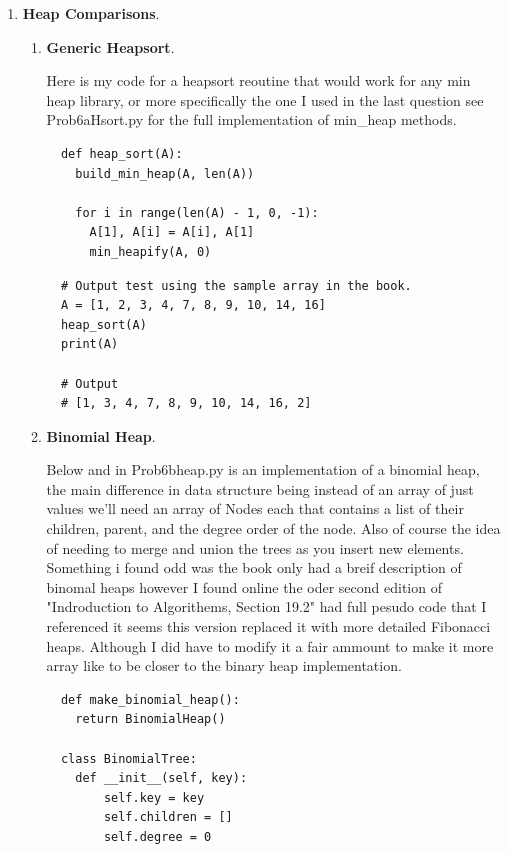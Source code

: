 \documentclass{article}
\begin{document}
\begin{enumerate}
\begin{enumerate}
  \end{enumerate}

  \item \textbf{Heap Comparisons}.
  
  \begin{enumerate}
    \item \textbf{Generic Heapsort}.
    
    Here is my code for a heapsort reoutine that would work for any min heap library, or more specifically the one I used in the last question see Prob6aHsort.py for the full implementation of min\_heap methods.
    
    \begin{lstlisting}
  def heap_sort(A):
    build_min_heap(A, len(A))

    for i in range(len(A) - 1, 0, -1):
      A[1], A[i] = A[i], A[1]
      min_heapify(A, 0)      
    \end{lstlisting}

    \begin{lstlisting}
  # Output test using the sample array in the book.
  A = [1, 2, 3, 4, 7, 8, 9, 10, 14, 16]
  heap_sort(A)
  print(A)

  # Output
  # [1, 3, 4, 7, 8, 9, 10, 14, 16, 2]
    \end{lstlisting}

    \item \textbf{Binomial Heap}.
    
    Below and in Prob6bheap.py is an implementation of a binomial heap, the main difference in data structure being instead of an array of just values we'll need an array of Nodes each that contains a list of their children, parent, and the degree order of the node.
    Also of course the idea of needing to merge and union the trees as you insert new elements.\\

    Something i found odd was the book only had a breif description of binomal heaps however I found online the oder second edition of "Indroduction to Algorithems, Section 19.2" had full pesudo code that I referenced it seems this version replaced it with more detailed Fibonacci heaps.
    Although I did have to modify it a fair ammount to make it more array like to be closer to the binary heap implementation.

    \begin{lstlisting}
  def make_binomial_heap():
    return BinomialHeap()

  class BinomialTree:
    def __init__(self, key):
        self.key = key
        self.children = []
        self.degree = 0


\end{lstlisting}
\end{enumerate}
\end{enumerate}
\end{document}
